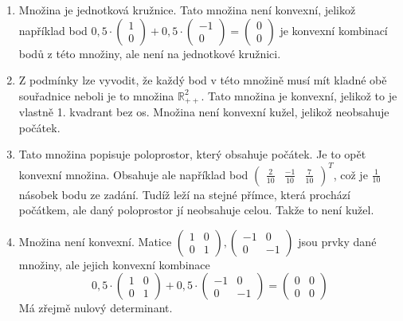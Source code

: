 \documentclass[12pt, a4paper]{article}
\begin{document}
\begin{enumerate}[label=\alph*)]
\item Množina je jednotková kružnice. Tato množina není konvexní, jelikož například bod $0,5 \cdot \begin{pmatrix}1 \\ 0\end{pmatrix} + 0,5 \cdot \begin{pmatrix}-1 \\ 0\end{pmatrix} = \begin{pmatrix}0 \\ 0\end{pmatrix}$ je konvexní kombinací bodů z této množiny, ale není na jednotkové kružnici. 
\item Z podmínky lze vyvodit, že každý bod v této množině musí mít kladné obě souřadnice neboli je to množina $\mathbb{R}^2_{++}$. Tato množina je konvexní, jelikož to je vlastně 1. kvadrant bez os. Množina není konvexní kužel, jelikož neobsahuje počátek.
\item Tato množina popisuje poloprostor, který obsahuje počátek. Je to opět konvexní množina. Obsahuje ale například bod $ \begin{pmatrix}\frac{2}{10} & \frac{-1}{10} & \frac{7}{10}\end{pmatrix}^T$, což je $\frac{1}{10}$ násobek bodu ze zadání. Tudíž leží na stejné přímce, která prochází počátkem, ale daný poloprostor jí neobsahuje celou. Takže to není kužel.
\item Množina není konvexní. Matice $\begin{pmatrix}1 & 0\\ 0 & 1\end{pmatrix}, \begin{pmatrix}-1 & 0\\ 0 & -1\end{pmatrix}$ jsou prvky dané množiny, ale jejich konvexní kombinace
\[
0,5\cdot \begin{pmatrix}1 & 0\\ 0 & 1\end{pmatrix} + 0,5 \cdot \begin{pmatrix}-1 & 0\\ 0 & -1\end{pmatrix} = \begin{pmatrix}0 & 0\\ 0 & 0\end{pmatrix}
\]
Má zřejmě nulový determinant.
\end{enumerate}
\end{document}
